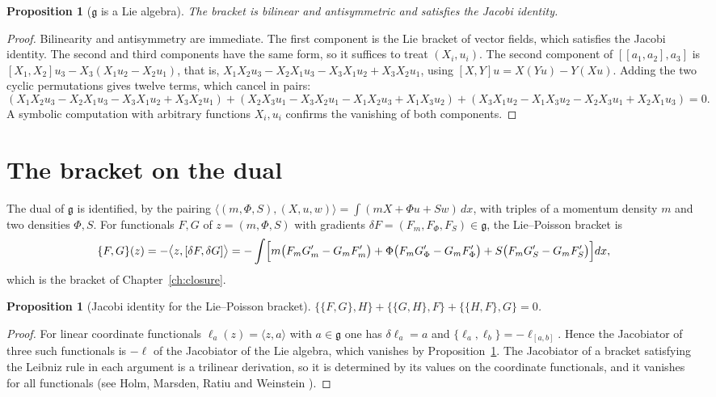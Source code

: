 \documentclass[11pt,oneside]{book}
\newtheorem{proposition}[theorem]{Proposition}
\theoremstyle{definition}
\theoremstyle{remark}
\begin{document}
\begin{proposition}[$\mathfrak g$ is a Lie algebra]\label{prop:app-lie}
The bracket is bilinear and antisymmetric and satisfies the Jacobi identity.
\end{proposition}

\begin{proof}
Bilinearity and antisymmetry are immediate. The first component is the Lie bracket of vector fields, which satisfies the Jacobi identity. The second and third components have the same form, so it suffices to treat $(X_i,u_i)$. The second component of $[[a_1,a_2],a_3]$ is $[X_1,X_2]u_3-X_3(X_1u_2-X_2u_1)$, that is, $X_1X_2u_3-X_2X_1u_3-X_3X_1u_2+X_3X_2u_1$, using $[X,Y]u=X(Yu)-Y(Xu)$. Adding the two cyclic permutations gives twelve terms, which cancel in pairs:
\[
(X_1X_2u_3-X_2X_1u_3-X_3X_1u_2+X_3X_2u_1)+(X_2X_3u_1-X_3X_2u_1-X_1X_2u_3+X_1X_3u_2)+(X_3X_1u_2-X_1X_3u_2-X_2X_3u_1+X_2X_1u_3)=0 .
\]
A symbolic computation with arbitrary functions $X_i,u_i$ confirms the vanishing of both components.
\end{proof}

\section*{The bracket on the dual}

The dual of $\mathfrak g$ is identified, by the pairing $\langle(m,\Phi,S),(X,u,w)\rangle=\int(mX+\Phi u+Sw)\,dx$, with triples of a momentum density $m$ and two densities $\Phi,S$. For functionals $F,G$ of $z=(m,\Phi,S)$ with gradients $\delta F=(F_m,F_\Phi,F_S)\in\mathfrak g$, the Lie--Poisson bracket is
\[
\{F,G\}(z)=-\bigl\langle z,[\delta F,\delta G]\bigr\rangle=-\int\Bigl[m\bigl(F_mG_m'-G_mF_m'\bigr)+\Phi\bigl(F_mG_\Phi'-G_mF_\Phi'\bigr)+S\bigl(F_mG_S'-G_mF_S'\bigr)\Bigr]dx ,
\]
which is the bracket of Chapter~\ref{ch:closure}.

\begin{proposition}[Jacobi identity for the Lie--Poisson bracket]\label{prop:app-jacobi}
$\{\{F,G\},H\}+\{\{G,H\},F\}+\{\{H,F\},G\}=0$.
\end{proposition}

\begin{proof}
For linear coordinate functionals $\ell_a(z)=\langle z,a\rangle$ with $a\in\mathfrak g$ one has $\delta\ell_a=a$ and $\{\ell_a,\ell_b\}=-\ell_{[a,b]}$. Hence the Jacobiator of three such functionals is $-\ell$ of the Jacobiator of the Lie algebra, which vanishes by Proposition~\ref{prop:app-lie}. The Jacobiator of a bracket satisfying the Leibniz rule in each argument is a trilinear derivation, so it is determined by its values on the coordinate functionals, and it vanishes for all functionals (see Holm, Marsden, Ratiu and Weinstein \cite{holm1985}).
\end{proof}
\end{document}
